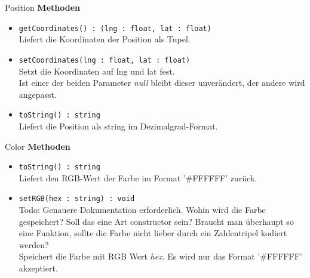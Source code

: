     \begin{Class}{Position}
        \textbf{Methoden}
        \begin{itemize}
            \item \texttt{getCoordinates() : (lng : float, lat : float)}
            \\ Liefert die Koordinaten der Position als Tupel.
            \item \texttt{setCoordinates(lng : float, lat : float)}
            \\ Setzt die Koordinaten auf lng und lat fest.
            \\ Ist einer der beiden Parameter \emph{null} bleibt dieser unverändert, der andere wird angepasst.
            \item \texttt{toString() : string}
            \\ Liefert die Position als string im Dezimalgrad-Format.
        \end{itemize}
    \end{Class}

    \begin{Class}{Color}
        \textbf{Methoden}
        \begin{itemize}
            \item \texttt{toString() : string}
            \\ Liefert den RGB-Wert der Farbe im Format '\#FFFFFF' zurück.
            \item \texttt{setRGB(hex : string) : void}
            \\ Todo: Genauere Dokumentation erforderlich. Wohin wird die Farbe gespeichert? Soll das eine Art constructor sein? Braucht man überhaupt so eine Funktion, sollte die Farbe nicht lieber durch ein Zahlentripel kodiert werden?
            \\ Speichert die Farbe mit RGB Wert \emph{hex}. Es wird nur das Format '\#FFFFFF' akzeptiert.
        \end{itemize}
    \end{Class}

